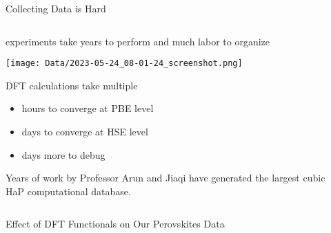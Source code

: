 \documentclass[10pt, aspectratio=169, presentation]{beamer}
\begin{document}
\begin{frame}[label={sec:org4e1033f}]{Collecting Data is Hard}
\begin{columns}
\begin{column}{0.7\columnwidth}
experiments take years to perform and much labor to organize
\autocite{almora-2020-devic-perfor}

\begin{center}
\texttt{[image: Data/2023-05-24\_08-01-24\_screenshot.png]}
\end{center}

\vspace{-0.5cm}DFT calculations take multiple
\begin{itemize}
\item hours to converge at PBE level
\item days to converge at HSE level
\item days more to debug
\end{itemize}
Years of work by Professor Arun and Jiaqi have generated
the largest cubic HaP computational database.\autocite{yang-2023-high-throug}
\end{column}

\begin{column}{0.3\columnwidth}
 
\begin{center}

\end{center}
\end{column}
\end{columns}
\end{frame}

\begin{frame}[label={sec:org45dd923}]{Effect of DFT Functionals on Our Perovskites Data}
 
\begin{center}

\end{center}
\end{frame}
\end{document}
